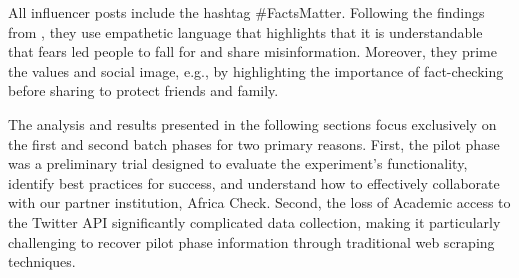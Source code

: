 All influencer posts include the hashtag \#FactsMatter. Following the findings from \cite{bowlesetal2022}, they use empathetic language that highlights that it is understandable that fears led people to fall for and share misinformation. Moreover, they prime the values and social image, e.g., by highlighting the importance of fact-checking before sharing to protect friends and family.

The analysis and results presented in the following sections focus exclusively on the first and second batch phases for two primary reasons. First, the pilot phase was a preliminary trial designed to evaluate the experiment's functionality, identify best practices for success, and understand how to effectively collaborate with our partner institution, Africa Check. Second, the loss of Academic access to the Twitter API significantly complicated data collection, making it particularly challenging to recover pilot phase information through traditional web scraping techniques.